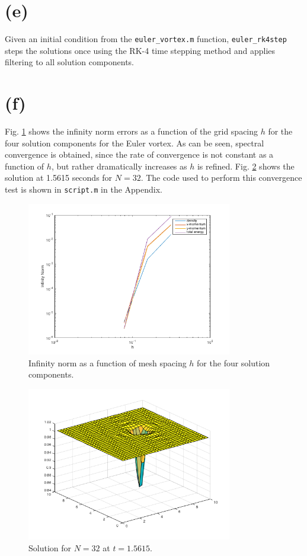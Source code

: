 \documentclass[10pt]{article}
\begin{document}
\section{(e)}
Given an initial condition from the {\tt euler\_vortex.m} function, {\tt euler\_rk4step} steps the solutions once using the RK-4 time stepping method and applies filtering to all solution components.

\section{(f)}
Fig. \ref{fig:convergence} shows the infinity norm errors as a function of the grid spacing \(h\) for the four solution components for the Euler vortex. As can be seen, spectral convergence is obtained, since the rate of convergence is not constant as a function of \(h\), but rather dramatically increases as \(h\) is refined. Fig. \ref{fig:100dt} shows the solution at 1.5615 seconds for \(N=32\). The code used to perform this convergence test is shown in {\tt script.m} in the Appendix.

\begin{figure}[H]
\centering
\includegraphics[width=0.8\textwidth]{figures/convergence.png}
\caption{Infinity norm as a function of mesh spacing \(h\) for the four solution components.}
\label{fig:convergence}
\end{figure}

\begin{figure}[H]
\centering
\includegraphics[width=0.8\textwidth]{figures/100dt.png}
\caption{Solution for \(N=32\) at \(t=1.5615\).}
\label{fig:100dt}
\end{figure}
\end{document}
